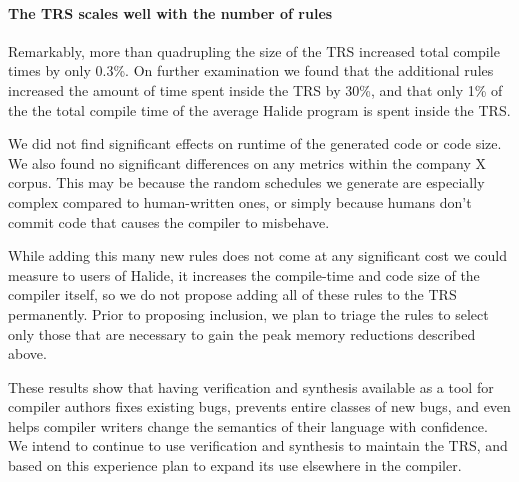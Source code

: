 \documentclass[acmsmall,review]{acmart}\settopmatter{printfolios=true,printccs=false,printacmref=false}
\newcommand{\hmax}[0]{\texttt{max}}
\newcommand{\hmin}[0]{\texttt{min}}
\newcommand{\rewrites}[0]{\:\rightarrow_{R}\:}
\begin{document}
\paragraph{The TRS scales well with the number of rules}
Remarkably, more than quadrupling the size of the TRS increased total compile
times by only 0.3\%. On further examination we found that the
additional rules increased the amount of time spent inside the TRS by
30\%, and that only 1\% of the the total compile time of the average
Halide program is spent inside the TRS.

We did not find significant effects on runtime of the generated code or code size. We also found no significant differences on any metrics within the company X corpus. This may be because the random schedules we generate are especially complex compared to human-written ones, or simply because humans don’t commit code that causes the compiler to misbehave.

While adding this many new rules does not come at any significant cost we could measure to users of Halide, it increases the compile-time and code size of the compiler itself, so we do not propose adding all of these rules to the TRS permanently. Prior to proposing inclusion, we plan to triage the rules to select only those that are necessary to gain the peak memory reductions described above.

These results show that having verification and synthesis available as a tool for compiler authors fixes existing bugs, prevents entire classes of new bugs, and even helps compiler writers change the semantics of their language with confidence. We intend to continue to use verification and synthesis to maintain the TRS, and based on this experience plan to expand its use elsewhere in the compiler.





\end{document}
